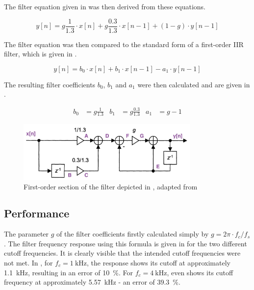 \documentclass[a4paper, 12pt]{article}
\begin{document}
The filter equation given in   was then derived from these equations.

\begin{equation}
	\label{eq:filter}
	y[n] = g \frac{1}{1.3} \cdot x[n] +
	g \frac{0.3}{1.3} \cdot x[n-1] +
	(1-g) \cdot y[n-1]
\end{equation}

The filter equation was then compared to the standard form of a first-order IIR filter, which is given in .

\begin{equation}
	\label{eq:first-order-iir}
	y[n] = b_0 \cdot x[n] + 
	b_1 \cdot x[n-1] - 
	a_1 \cdot y[n-1]
\end{equation}

The resulting filter coefficients $b_0$, $b_1$ and $a_1$ were then calculated and are given in .

\begin{align}
	\label{eq:coefficients}
	b_0 &= g \frac{1}{1.3} &
	b_1 &= g \frac{0.3}{1.3} &
	a_1 &= g - 1
\end{align}

\begin{figure}
	\centering
	\includegraphics[width=0.8\textwidth]{first-order-section.jpg}
	\caption{First-order section of the filter depicted in , adapted from \cite{Vaelimaeki2006}}
	\label{fig:first-order-section}
\end{figure}

\subsection{Performance}

The parameter $g$ of the filter coefficients firstly calculated simply by $g = 2 \pi \cdot f_c / f_s$. The filter frequency response using this formula is given in  for the two different cutoff frequencies. It is clearly visible that the intended cutoff frequencies were not met. In , for $f_c = \SI{1}{\kilo\hertz}$, the response shows its cutoff at approximately \SI{1.1}{\kilo\hertz}, resulting in an error of \SI{10}{\percent}. For $f_c = \SI{4}{\kilo\hertz}$,  even shows its cutoff frequency at approximately \SI{5.57}{\kilo\hertz} - an error of \SI{39.3}{\percent}.
\end{document}
